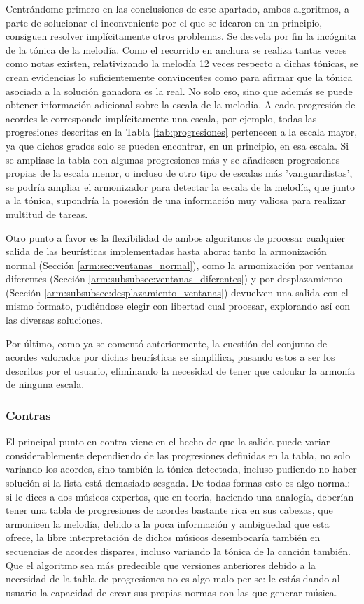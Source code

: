 Centrándome primero en las conclusiones de este apartado, ambos algoritmos, a parte de solucionar el inconveniente por el que se idearon en un principio, consiguen resolver implícitamente otros problemas. Se desvela por fin la incógnita de la tónica de la melodía. Como el recorrido en anchura se realiza tantas veces como notas existen, relativizando la melodía 12 veces respecto a dichas tónicas, se crean evidencias lo suficientemente convincentes como para afirmar que la tónica asociada a la solución ganadora es la real. No solo eso, sino que además se puede obtener información adicional sobre la escala de la melodía. A cada progresión de acordes le corresponde implícitamente una escala, por ejemplo, todas las progresiones descritas en la Tabla \ref{tab:progresiones} pertenecen a la escala mayor, ya que dichos grados solo se pueden encontrar, en un principio, en esa escala. Si se ampliase la tabla con algunas progresiones más y se añadiesen progresiones propias de la escala menor, o incluso de otro tipo de escalas más 'vanguardistas', se podría ampliar el armonizador para detectar la escala de la melodía, que junto a la tónica, supondría la posesión de una información muy valiosa para realizar multitud de tareas.

Otro punto a favor es la flexibilidad de ambos algoritmos de procesar cualquier salida de las heurísticas implementadas hasta ahora: tanto la armonización normal (Sección \ref{arm:sec:ventanas_normal}), como la armonización por ventanas diferentes (Sección \ref{arm:subsubsec:ventanas_diferentes}) y por desplazamiento (Sección \ref{arm:subsubsec:desplazamiento_ventanas}) devuelven una salida con el mismo formato, pudiéndose elegir con libertad cual procesar, explorando así con las diversas soluciones. 

Por último, como ya se comentó anteriormente, la cuestión del conjunto de acordes valorados por dichas heurísticas se simplifica, pasando estos a ser  los descritos por el usuario, eliminando la necesidad de tener que calcular la armonía de ninguna escala.

\subsubsection{Contras}

El principal punto en contra viene en el hecho de que la salida puede variar considerablemente dependiendo de las progresiones definidas en la tabla, no solo variando los acordes, sino también la tónica detectada, incluso pudiendo no haber solución si la lista está demasiado sesgada. De todas formas esto es algo normal: si le dices a dos músicos expertos, que en teoría, haciendo una analogía, deberían tener una tabla de progresiones de acordes bastante rica en sus cabezas, que armonicen la melodía, debido a la poca información y ambigüedad que esta ofrece, la libre interpretación de dichos músicos desembocaría también en secuencias de acordes dispares, incluso variando la tónica de la canción también. Que el algoritmo sea más predecible que versiones anteriores debido a la necesidad de la tabla de progresiones no es algo malo per se: le estás dando al usuario la capacidad de crear sus propias normas con las que generar música. 

